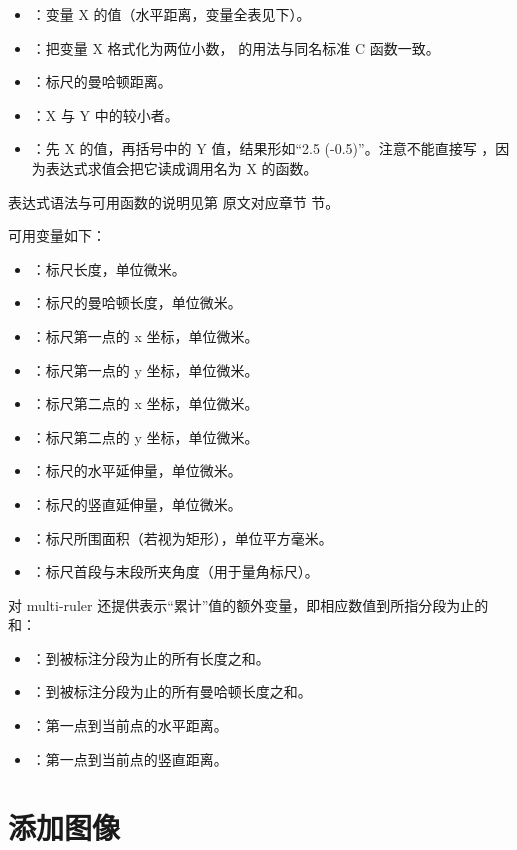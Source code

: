 \begin{itemize}
\item {}：变量 X 的值（水平距离，变量全表见下）。
\item {}：把变量 X 格式化为两位小数， 的用法与同名标准 C 函数一致。
\item {}：标尺的曼哈顿距离。
\item {}：X 与 Y 中的较小者。
\item {}：先 X 的值，再括号中的 Y 值，结果形如“2.5 (-0.5)”。注意不能直接写 ，因为表达式求值会把它读成调用名为 X 的函数。
\end{itemize}

表达式语法与可用函数的说明见第 原文对应章节 节。

可用变量如下：

\begin{itemize}
\item {}：标尺长度，单位微米。
\item {}：标尺的曼哈顿长度，单位微米。
\item {}：标尺第一点的 x 坐标，单位微米。
\item {}：标尺第一点的 y 坐标，单位微米。
\item {}：标尺第二点的 x 坐标，单位微米。
\item {}：标尺第二点的 y 坐标，单位微米。
\item {}：标尺的水平延伸量，单位微米。
\item {}：标尺的竖直延伸量，单位微米。
\item {}：标尺所围面积（若视为矩形），单位平方毫米。
\item {}：标尺首段与末段所夹角度（用于量角标尺）。
\end{itemize}

对 multi-ruler 还提供表示“累计”值的额外变量，即相应数值到所指分段为止的和：

\begin{itemize}
\item {}：到被标注分段为止的所有长度之和。
\item {}：到被标注分段为止的所有曼哈顿长度之和。
\item {}：第一点到当前点的水平距离。
\item {}：第一点到当前点的竖直距离。
\end{itemize}

\section{添加图像}\label{sec:images}

